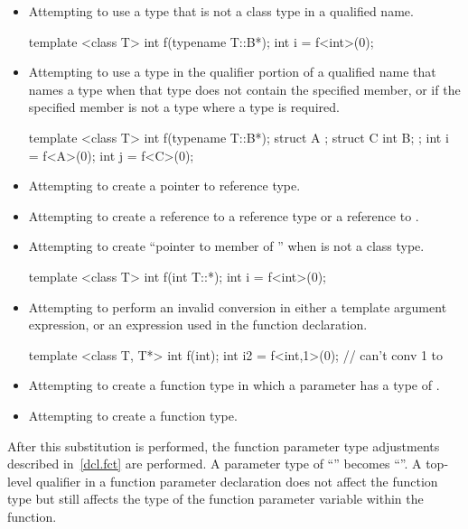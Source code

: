 \begin{itemize}
\begin{itemize}
\item Attempting to use a type that is not a class type in a qualified name.
\enterexample
\begin{codeblock}
template <class T> int f(typename T::B*);
int i = f<int>(0);
\end{codeblock}
\exitexample

\item Attempting to use a type in the qualifier portion of a qualified name
that names a type when that type does not contain the specified member, or
if the specified member is not a type where a type is required.
\enterexample
\begin{codeblock}
template <class T> int f(typename T::B*);
struct A {};
struct C { int B; };
int i = f<A>(0);
int j = f<C>(0);
\end{codeblock}
\exitexample

\item Attempting to create a pointer to reference type.

\item Attempting to create a reference to a reference type or a reference
to .

\item Attempting to create ``pointer to member of '' when 
is not a class type.
\enterexample
\begin{codeblock}
template <class T> int f(int T::*);
int i = f<int>(0);
\end{codeblock}
\exitexample

\item Attempting to perform an invalid conversion in either a template
argument expression, or an expression used in the function declaration.
\enterexample
\begin{codeblock}
template <class T, T*> int f(int);
int i2 = f<int,1>(0);		// can't conv 1 to 
\end{codeblock}
\exitexample

\item Attempting to create a function type in which a parameter has a type
of .

\item Attempting to create a  function type.

\end{itemize}

\end{itemize}

\pnum
After this substitution is performed, the function parameter type
adjustments described in~\ref{dcl.fct} are performed.
\enterexample
A parameter type of ``'' becomes
``''.
\exitexample
\enternote
A top-level qualifier in a function parameter declaration does not affect
the function type but still affects the type of the function parameter
variable within the function.
\exitnoteb
\enterexample

